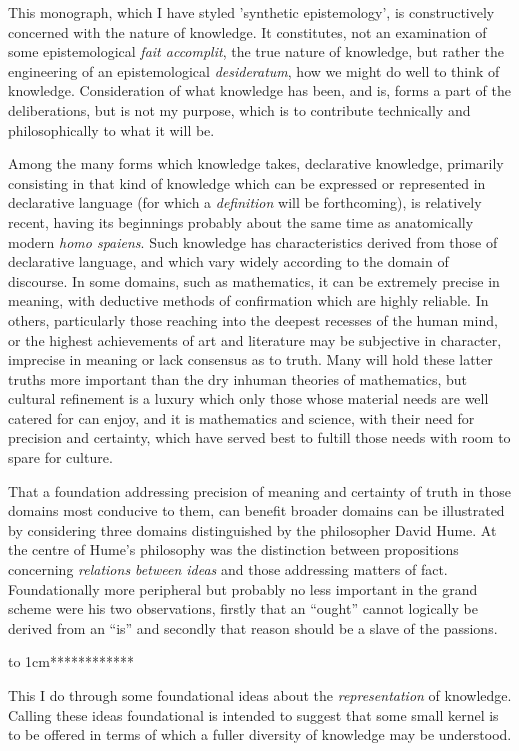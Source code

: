 This monograph, which I have styled 'synthetic epistemology', is constructively concerned with the nature of knowledge.
It constitutes, not an examination of some epistemological \emph{fait accomplit}, the true nature of knowledge, but rather the engineering of an epistemological \emph{desideratum}, how we might do well to think of knowledge.
Consideration of what knowledge has been, and is, forms a part of the deliberations, but is not my purpose, which is to contribute technically and philosophically to what it will be.

Among the many forms which knowledge takes, declarative knowledge, primarily consisting in that kind of knowledge which can be expressed or represented in declarative language (for which a \emph{definition} will be forthcoming), is relatively recent, having its beginnings probably about the same time as anatomically modern \emph{homo spaiens}.
Such knowledge has characteristics derived from those of declarative language, and which vary widely according to the domain of discourse.
In some domains, such as mathematics, it can be extremely precise in meaning, with deductive methods of confirmation which are highly reliable.
In others, particularly those reaching into the deepest recesses of the human mind, or the highest achievements of art and literature may be subjective in character, imprecise in meaning or lack consensus as to truth.
Many will hold these latter truths more important than the dry inhuman theories of mathematics, but cultural refinement is a luxury which only those whose material needs are well catered for can enjoy, and it is mathematics and science, with their need for precision and certainty, which have served best to fultill those needs with room to spare for culture.

That a foundation addressing precision of meaning and certainty of truth in those domains most conducive to them, can benefit broader domains can be illustrated by considering three domains distinguished by the philosopher David Hume.
At the centre of Hume's philosophy was the distinction between propositions concerning \emph{relations between ideas} and those addressing matters of fact.
Foundationally more peripheral but probably no less important in the grand scheme were his two observations, firstly that an ``ought'' cannot logically be derived from an ``is'' and secondly that reason should be a slave of the passions.

\vbox to 1cm{\vfil ************* \vfil}

This I do through some foundational ideas about the \emph{representation} of knowledge.
Calling these ideas foundational is intended to suggest that some small kernel is to be offered in terms of which a fuller diversity of knowledge may be understood.

